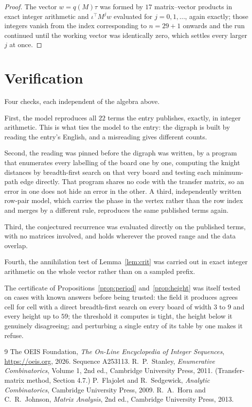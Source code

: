 \documentclass[11pt,a4paper]{article}
\theoremstyle{plain}
\theoremstyle{definition}
\begin{document}
\begin{proof}
The vector $w=q(M)\tau$ was formed by $17$ matrix--vector products in exact integer
arithmetic and $\iota^{\!\top}M^{j}w$ evaluated for $j=0,1,\dots$, again exactly; those
integers vanish from the index corresponding to $n=29+1$ onwards and the run continued
until the working vector was identically zero, which settles every larger $j$ at once.
\end{proof}

\section{Verification}

Four checks, each independent of the algebra above.

First, the model reproduces all $22$ terms the entry publishes, exactly, in integer
arithmetic. This is what ties the model to the entry: the digraph is built by reading the
entry's English, and a misreading gives different counts.

Second, the reading was pinned before the digraph was written, by a program that enumerates
every labelling of the board one by one, computing the knight distances by breadth-first
search on that very board and testing each minimum-path edge directly. That program shares no
code with the transfer matrix, so an error in one does not hide an error in the other. A
third, independently written row-pair model, which carries the phase in the vertex rather than
the row index and merges by a different rule, reproduces the same published terms again.

Third, the conjectured recurrence was evaluated directly on the published terms, with no
matrices involved, and holds wherever the proved range and the data overlap.

Fourth, the annihilation test of Lemma~\ref{lem:crit} was carried out in exact integer
arithmetic on the whole vector rather than on a sampled prefix.

The certificate of Propositions~\ref{prop:period} and~\ref{prop:height} was itself tested
on cases with known answers before being trusted: the field it produces agrees cell for cell
with a direct breadth-first search on every board of width $3$ to $9$ and every height up to
$59$; the threshold it computes is tight, the height below it genuinely disagreeing; and
perturbing a single entry of its table by one makes it refuse.

\begin{thebibliography}{9}
 The OEIS Foundation, \emph{The On-Line Encyclopedia of Integer
Sequences}, \url{https://oeis.org}, 2026. Sequence A253113.
 R.~P.~Stanley, \emph{Enumerative Combinatorics}, Volume 1, 2nd ed.,
Cambridge University Press, 2011. (Transfer-matrix method, Section 4.7.)
 P.~Flajolet and R.~Sedgewick, \emph{Analytic Combinatorics}, Cambridge
University Press, 2009.
 R.~A.~Horn and C.~R.~Johnson, \emph{Matrix Analysis}, 2nd ed., Cambridge
University Press, 2013.
\end{thebibliography}
\end{document}
